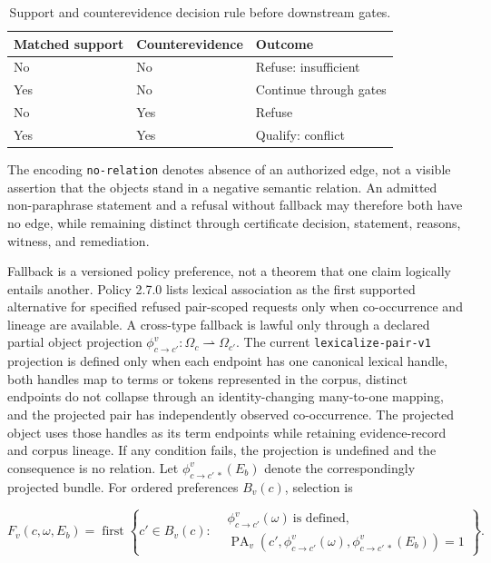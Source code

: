 \documentclass[manuscript,screen,review]{acmart}
\begin{document}
\begin{table}[t]
  \caption{Support and counterevidence decision rule before downstream gates.}
  \label{tab:counterevidence}
  \centering
  \small
  \begin{tabular}{lll}
    \toprule
    Matched support & Counterevidence & Outcome \\
    \midrule
    No & No & Refuse: insufficient \\
    Yes & No & Continue through gates \\
    No & Yes & Refuse \\
    Yes & Yes & Qualify: conflict \\
    \bottomrule
  \end{tabular}
\end{table}

The encoding \texttt{no-relation} denotes absence of an authorized edge, not a visible assertion that the objects stand in a negative semantic relation. An admitted non-paraphrase statement and a refusal without fallback may therefore both have no edge, while remaining distinct through certificate decision, statement, reasons, witness, and remediation.

Fallback is a versioned policy preference, not a theorem that one claim logically entails another. Policy 2.7.0 lists lexical association as the first supported alternative for specified refused pair-scoped requests only when co-occurrence and lineage are available. A cross-type fallback is lawful only through a declared partial object projection $\phi^v_{c\rightarrow c'}:\Omega_c\rightharpoonup\Omega_{c'}$. The current \texttt{lexicalize-pair-v1} projection is defined only when each endpoint has one canonical lexical handle, both handles map to terms or tokens represented in the corpus, distinct endpoints do not collapse through an identity-changing many-to-one mapping, and the projected pair has independently observed co-occurrence. The projected object uses those handles as its term endpoints while retaining evidence-record and corpus lineage. If any condition fails, the projection is undefined and the consequence is no relation. Let $\phi^v_{c\rightarrow c'\,*}(E_b)$ denote the correspondingly projected bundle. For ordered preferences $B_v(c)$, selection is

\begin{equation}
F_v(c,\omega,E_b)=\operatorname{first}\left\{c'\in B_v(c):
\begin{aligned}
&\phi^v_{c\rightarrow c'}(\omega)\ \text{is defined},\\
&\operatorname{PA}_v\!\left(c',\phi^v_{c\rightarrow c'}(\omega),\phi^v_{c\rightarrow c'\,*}(E_b)\right)=1
\end{aligned}\right\}.
\label{eq:fallback}
\end{equation}
\end{document}
